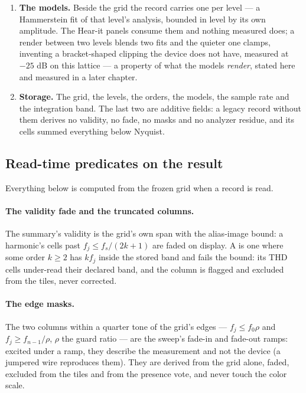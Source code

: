 \documentclass[11pt,a4paper]{article}
\begin{document}
{\begin{enumerate}
\item \textbf{The models.} Beside the grid the record carries one
 per level --- a Hammerstein fit of that level's
analysis, bounded in level by its own amplitude. The Hear-it panels
consume them and nothing measured does; a render between two levels blends
two fits and the quieter one clamps, inventing a bracket-shaped clipping
the device does not have, measured at $-25$ dB on this lattice --- a
property of what the models \emph{render}, stated here and measured in a
later chapter.

\item \textbf{Storage.} The grid, the levels, the orders, the models, the
sample rate and the integration band. The last two are additive fields: a
legacy record without them derives no validity, no fade, no masks and no
analyzer residue, and its cells summed everything below Nyquist.
\end{enumerate}
\par}

\subsection{Read-time predicates on the result}
\label{sec:journey-predicates}
Everything below is computed from the frozen grid when a record is read.

\paragraph{The validity fade and the truncated columns.} The summary's
validity is the grid's own span with the alias-image bound: a harmonic's
cells past $f_j \le f_s/(2k+1)$ are faded on display. A 
is one where some order $k \ge 2$ has $k f_j$ inside the stored band and
fails the bound: its THD cells under-read their declared band, and the
column is flagged and excluded from the tiles, never corrected.

\paragraph{The edge masks.} The two columns within a quarter tone of the
grid's edges --- $f_j \le f_0 \rho$ and $f_j \ge f_{n-1}/\rho$, $\rho$ the
guard ratio --- are the sweep's fade-in and fade-out ramps: excited under a
ramp, they describe the measurement and not the device (a jumpered wire
reproduces them). They are derived from the grid alone, faded, excluded
from the tiles and from the presence vote, and never touch the color
scale.
\end{document}
